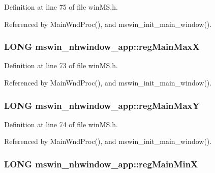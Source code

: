 Definition at line 75 of file win\+M\+S.\+h.



Referenced by Main\+Wnd\+Proc(), and mswin\+\_\+init\+\_\+main\+\_\+window().

\hypertarget{structmswin__nhwindow__app_a39cbafd956ec42730695d92a85cc0f8e}{
\subsubsection[{reg\+Main\+Max\+X}]{\setlength{\rightskip}{0pt plus 5cm}L\+O\+N\+G mswin\+\_\+nhwindow\+\_\+app\+::reg\+Main\+Max\+X}}\label{structmswin__nhwindow__app_a39cbafd956ec42730695d92a85cc0f8e}


Definition at line 73 of file win\+M\+S.\+h.



Referenced by Main\+Wnd\+Proc(), and mswin\+\_\+init\+\_\+main\+\_\+window().

\hypertarget{structmswin__nhwindow__app_a30fff66ef9cdfb4e7b8fd4c95ea67d8e}{
\subsubsection[{reg\+Main\+Max\+Y}]{\setlength{\rightskip}{0pt plus 5cm}L\+O\+N\+G mswin\+\_\+nhwindow\+\_\+app\+::reg\+Main\+Max\+Y}}\label{structmswin__nhwindow__app_a30fff66ef9cdfb4e7b8fd4c95ea67d8e}


Definition at line 74 of file win\+M\+S.\+h.



Referenced by Main\+Wnd\+Proc(), and mswin\+\_\+init\+\_\+main\+\_\+window().

\hypertarget{structmswin__nhwindow__app_a7a0b798261b9482e14eaacc0d4bd1fb0}{
\subsubsection[{reg\+Main\+Min\+X}]{\setlength{\rightskip}{0pt plus 5cm}L\+O\+N\+G mswin\+\_\+nhwindow\+\_\+app\+::reg\+Main\+Min\+X}}\label{structmswin__nhwindow__app_a7a0b798261b9482e14eaacc0d4bd1fb0}


